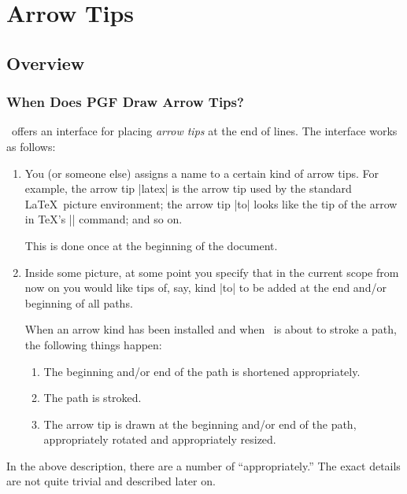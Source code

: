 %


\section{Arrow Tips}
\label{section-arrows}


\subsection{Overview}

\subsubsection{When Does PGF Draw Arrow Tips?}

\pgfname\ offers an interface for placing \emph{arrow tips} at the end
of lines. The interface works as follows:

\begin{enumerate}
\item
  You (or someone else) assigns a name to a certain kind of arrow
  tips. For example, the 
  arrow tip |latex| is the arrow tip used by the standard \LaTeX\
  picture environment; the arrow tip |to| looks like the tip of the
  arrow in \TeX's |\to| command; and so on.

  This is done once at the beginning of the document.
\item
  Inside some picture, at some point you specify that in the current
  scope from now on you would like tips of, say, kind |to| to be added
  at the end and/or beginning of all paths.

  When an arrow kind has been installed and when \pgfname\ is about to
  stroke a path, the following things happen:
  \begin{enumerate}
  \item
    The beginning and/or end of the path is shortened appropriately.
  \item
    The path is stroked.
  \item
    The arrow tip is drawn at the beginning and/or end of the path,
    appropriately rotated and appropriately resized.
  \end{enumerate}
\end{enumerate}

In the above description, there are a number of ``appropriately.''
The exact details are not quite trivial and described later on.

